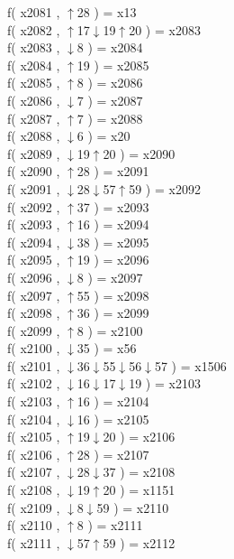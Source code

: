 f( x2081 , $\uparrow$28 ) = x13 \\
f( x2082 , $\uparrow$17$\downarrow$19$\uparrow$20 ) = x2083 \\
f( x2083 , $\downarrow$8 ) = x2084 \\
f( x2084 , $\uparrow$19 ) = x2085 \\
f( x2085 , $\uparrow$8 ) = x2086 \\
f( x2086 , $\downarrow$7 ) = x2087 \\
f( x2087 , $\uparrow$7 ) = x2088 \\
f( x2088 , $\downarrow$6 ) = x20 \\
f( x2089 , $\downarrow$19$\uparrow$20 ) = x2090 \\
f( x2090 , $\uparrow$28 ) = x2091 \\
f( x2091 , $\downarrow$28$\downarrow$57$\uparrow$59 ) = x2092 \\
f( x2092 , $\uparrow$37 ) = x2093 \\
f( x2093 , $\uparrow$16 ) = x2094 \\
f( x2094 , $\downarrow$38 ) = x2095 \\
f( x2095 , $\uparrow$19 ) = x2096 \\
f( x2096 , $\downarrow$8 ) = x2097 \\
f( x2097 , $\uparrow$55 ) = x2098 \\
f( x2098 , $\uparrow$36 ) = x2099 \\
f( x2099 , $\uparrow$8 ) = x2100 \\
f( x2100 , $\downarrow$35 ) = x56 \\
f( x2101 , $\downarrow$36$\downarrow$55$\downarrow$56$\downarrow$57 ) = x1506 \\
f( x2102 , $\downarrow$16$\downarrow$17$\downarrow$19 ) = x2103 \\
f( x2103 , $\uparrow$16 ) = x2104 \\
f( x2104 , $\downarrow$16 ) = x2105 \\
f( x2105 , $\uparrow$19$\downarrow$20 ) = x2106 \\
f( x2106 , $\uparrow$28 ) = x2107 \\
f( x2107 , $\downarrow$28$\downarrow$37 ) = x2108 \\
f( x2108 , $\downarrow$19$\uparrow$20 ) = x1151 \\
f( x2109 , $\downarrow$8$\downarrow$59 ) = x2110 \\
f( x2110 , $\uparrow$8 ) = x2111 \\
f( x2111 , $\downarrow$57$\uparrow$59 ) = x2112 \\

